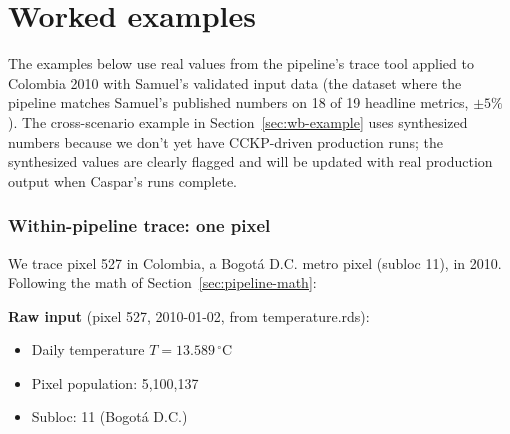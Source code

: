 \documentclass[11pt]{article}
\newcommand{\PAF}{\text{PAF}}
\newcommand{\mIHME}{m^{\text{IHME}}}
\begin{document}
\begin{center}
\end{center}

\part{Worked examples}

The examples below use real values from the pipeline's trace tool applied
to Colombia 2010 with Samuel's validated input data (the dataset where
the pipeline matches Samuel's published numbers on 18 of 19 headline
metrics, $\pm 5\%$). The cross-scenario example in
Section~\ref{sec:wb-example} uses synthesized numbers because we don't
yet have CCKP-driven production runs; the synthesized values are clearly
flagged and will be updated with real production output when Caspar's
runs complete.

\section{Within-pipeline trace: one pixel}
\label{sec:trace-one-pixel}

We trace pixel 527 in Colombia, a Bogotá D.C. metro pixel (subloc 11),
in 2010. Following the math of Section~\ref{sec:pipeline-math}:

\textbf{Raw input} (pixel 527, 2010-01-02, from temperature.rds):
\begin{itemize}[itemsep=0pt]
  \item Daily temperature $T = 13.589\,^{\circ}$C
  \item Pixel population: 5{,}100{,}137
  \item Subloc: 11 (Bogotá D.C.)
\end{itemize}
\end{document}
